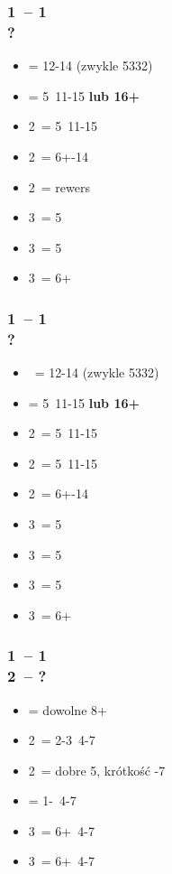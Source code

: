 \documentclass[12pt, a4paper]{article}
\begin{document}
\subsubsection*{1\hearts\ -- 1\ntx\ \\ ?}
\begin{itemize}
    \item \pass = 12-14 (zwykle 5332)
    \item \alrts{2\clubs} = 5\hearts\clubs\ 11-15 \textbf{lub 16+} \fonce \imp
    \item 2\diams\ = 5\diams\ 11-15
    \item 2\hearts\ = 6+-14
    \item 2\spades\ = rewers
    \item 3\clubs\ = 5\clubs\ \gf
    \item 3\diams\ = 5\diams\ \gf
    \item 3\hearts\ = 6+\hearts\ \inv
\end{itemize}

\subsubsection*{1\spades\ -- 1\ntx\ \\ ?}
\begin{itemize}
    \item \pass\ = 12-14 (zwykle 5332)
    \item \alrts{2\clubs} = 5\spades\clubs\ 11-15 \textbf{lub 16+} \fonce \imp
    \item 2\diams\ = 5\diams\ 11-15
    \item 2\hearts\ = 5\hearts\ 11-15
    \item 2\spades\ = 6+-14
    \item 3\clubs\ = 5\clubs\ \gf
    \item 3\diams\ = 5\diams\ \gf
    \item 3\hearts\ = 5\hearts\ \gf
    \item 3\spades\ = 6+\spades\ \inv
\end{itemize}

\subsubsection*{1\hearts\ -- 1\spades\ \\ 2\clubs\ -- ?}
\begin{itemize}
    \item \alrts{2\diams} = dowolne 8+ \imp
    \item 2\hearts\ = 2-3\hearts\ 4-7
    \item 2\spades\ = dobre 5\spades, krótkość -7
    \item \alrts{2\ntx} = 1-\hearts\ 4-7
    \item 3\clubs\ = 6+\clubs\ 4-7
    \item 3\diams\ = 6+\diams\ 4-7
\end{itemize}
\end{document}
